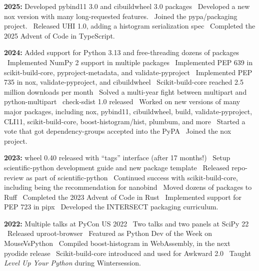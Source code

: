 \documentclass[10pt,letterpaper]{moderncv}
\begin{document}
\textbf{2025:}
Developed pybind11 3.0 and cibuildwheel 3.0 packages \textbullet\
Developed a new nox version with many long-requested features. \textbullet\
Joined the pypa/packaging project. \textbullet\
Released UHI 1.0, adding a histogram serialization spec \textbullet\
Completed the 2025 Advent of Code in TypeScript.


\textbf{2024:}
Added support for Python 3.13 and free-threading dozens of packages \textbullet\
Implemented NumPy 2 support in multiple packages \textbullet\
Implemented PEP 639 in scikit-build-core, pyproject-metadata, and validate-pyproject \textbullet\
Implemented PEP 735 in nox, validate-pyproject, and cibuildwheel \textbullet\
Scikit-build-core reached 2.5 million downloads per month \textbullet\
Solved a multi-year fight between multipart and python-multipart \textbullet\
check-sdist 1.0 released \textbullet\
Worked on new versions of many major packages, including nox, pybind11,
cibuildwheel, build, validate-pyproject, CLI11, scikit-build-core, boost-histogram/hist,
plumbum, and more \textbullet\
Started a vote that got dependency-groups accepted into the PyPA \textbullet\
Joined the nox project.

\textbf{2023:}
wheel 0.40 released with ``tags'' interface (after 17 months!) \textbullet\
Setup scientific-python development guide and new package template \textbullet\
Released repo-review as part of scientific-python \textbullet\
Continued success with scikit-build-core, including being the recommendation for nanobind \textbullet\
Moved dozens of packages to Ruff \textbullet\
Completed the 2023 Advent of Code in Rust \textbullet\
Implemented support for PEP 723 in pipx \textbullet\
Developed the INTERSECT packaging curriculum.

\textbf{2022:}
Multiple talks at PyCon US 2022 \textbullet\
Two talks and two panels at SciPy 22 \textbullet\
Released uproot-browser \textbullet\
Featured as Python Dev of the Week on MouseVsPython \textbullet\
Compiled boost-histogram in WebAssembly, in the next pyodide release \textbullet\
Scikit-build-core introduced and used for Awkward 2.0 \textbullet\
Taught \emph{Level Up Your Python} during Wintersession.
\end{document}
